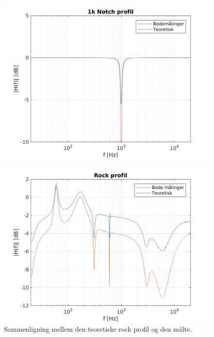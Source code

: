 \begin{figure}[h]
    \centering
    \includegraphics[]{matlabdemo/test/eq_1knotch.png}
\end{figure}

\begin{figure}[h]
\includegraphics[]{matlabdemo/test/eq_rock.png}
\caption{Sammenligning mellem den teoretiske rock profil og den målte.}
\end{figure}
















	
